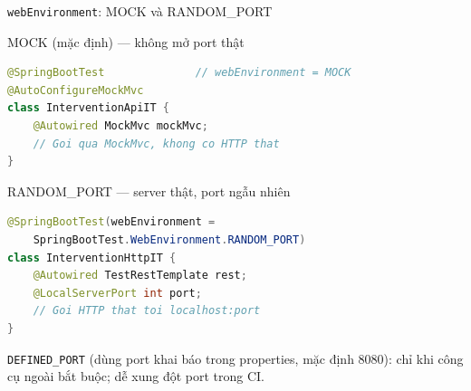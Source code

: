 \documentclass[aspectratio=169,12pt]{beamer}
\begin{document}
\begin{frame}[fragile]{\texttt{webEnvironment}: MOCK và RANDOM\_PORT}
  \begin{block}{MOCK (mặc định) --- không mở port thật}
\begin{lstlisting}[language=Java,style=code,basicstyle=\ttfamily\scriptsize,aboveskip=0pt]
@SpringBootTest              // webEnvironment = MOCK
@AutoConfigureMockMvc
class InterventionApiIT {
    @Autowired MockMvc mockMvc;
    // Goi qua MockMvc, khong co HTTP that
}
\end{lstlisting}
  \end{block}
  \begin{block}{RANDOM\_PORT --- server thật, port ngẫu nhiên}
\begin{lstlisting}[language=Java,style=code,basicstyle=\ttfamily\scriptsize,aboveskip=0pt]
@SpringBootTest(webEnvironment =
    SpringBootTest.WebEnvironment.RANDOM_PORT)
class InterventionHttpIT {
    @Autowired TestRestTemplate rest;
    @LocalServerPort int port;
    // Goi HTTP that toi localhost:port
}
\end{lstlisting}
  \end{block}
  \small \texttt{DEFINED\_PORT} (dùng port khai báo trong properties, mặc định
  8080): chỉ khi công cụ ngoài bắt buộc;
  dễ xung đột port trong CI.
\end{frame}
\end{document}
